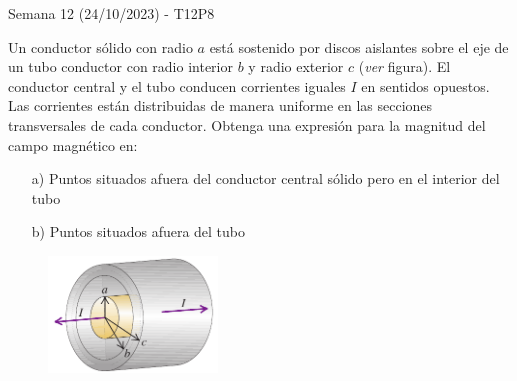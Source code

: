 \begin{frame}{Semana 12 (24/10/2023) - T12P8}

Un conductor sólido con radio $a$ está sostenido por discos aislantes sobre el eje de un tubo conductor con radio interior $b$ y radio exterior $c$ (\textit{ver} figura). El conductor central y el tubo conducen corrientes
iguales $I$ en sentidos opuestos. Las
corrientes están distribuidas de
manera uniforme en las secciones
transversales de cada conductor. Obtenga una expresión para la magnitud del campo magnético en:

\begin{itemize}
    \item[a)] Puntos situados afuera del conductor
central sólido pero en el interior del tubo
    \item[b)] Puntos
situados afuera del tubo
\end{itemize}

\begin{figure}
        \centering
        \includegraphics[width=0.4\textwidth]{figures/t14p1.png}
    \end{figure}
    
\end{frame}


